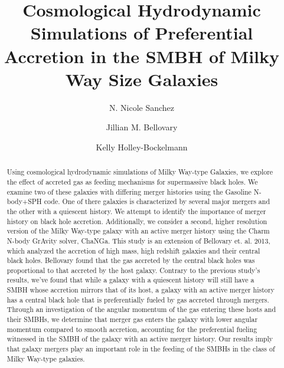 \documentclass[manuscript]{aastex}
\begin{document}
 

\title{Cosmological Hydrodynamic Simulations of Preferential Accretion in the SMBH of Milky Way Size Galaxies}



\author{N. Nicole Sanchez }
\author{Jillian M. Bellovary}
\author{Kelly Holley-Bockelmann}



\begin{abstract}\label{abs:abstractlabel}

Using cosmological hydrodynamic simulations of Milky Way-type Galaxies, we explore the effect of accreted gas as feeding mechanisms for supermassive black holes. We examine two of these galaxies with differing merger histories using the Gasoline N-body+SPH code. One of there galaxies is characterized by several major mergers and the other with a quiescent history. We attempt to identify the importance of merger history on black hole accretion. Additionally, we consider a second, higher resolution version of the Milky Way-type galaxy with an active merger history using the Charm N-body GrAvity solver, ChaNGa.  This study is an extension of Bellovary et. al. 2013, which analyzed the accretion of high mass, high redshift galaxies and their central black holes. Bellovary found that the gas accreted by the central black holes was proportional to that accreted by the host galaxy. Contrary to the previous study's results, we've found that while a galaxy with a quiescent history will still have a SMBH whose accretion mirrors that of its host, a galaxy with an active merger history has a central black hole that is preferentially fueled by gas accreted through mergers. Through an investigation of the angular momentum of the gas entering these hosts and their SMBHs, we determine that merger gas enters the galaxy with lower angular momentum compared to smooth accretion, accounting for the preferential fueling witnessed in the SMBH of the galaxy with an active merger history. Our results imply that galaxy mergers play an important role in the feeding of the SMBHs in the class of Milky Way-type galaxies.

\end{abstract}
\end{document}
